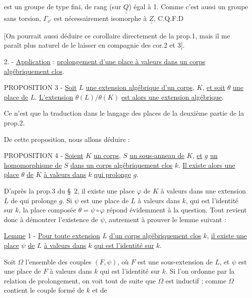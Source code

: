 est un groupe de type fini, de rang (sur $\underline{\underline Q}$) égal à 1. Comme c'est aussi un groupe sans torsion, $\Gamma_{v'}$ est nécessairement isomorphe à $\underline{\underline Z}$, C.Q.F.D

[On pourrait aussi déduire ce corollaire directement de la prop.1, mais il me paraît plus naturel de le laisser en compagnie des cor.2 et 3].

2. - \uline{Application} : \uline{prolongement d'une place à valeurs dans un corps algébriquement clos}.

PROPOSITION 3 - \uline{Soit} $L$ \uline{une extension algébrique d'un corps}, $K$, \uline{et soit} $\theta$ \uline{une place de} $L$. \uline{L'extension} $\theta(L)/\theta(K)$ \uline{est alors une extension algébrique}.

Ce n'est que la traduction dans le langage des places de la deuxième partie de la prop.2.

De cette proposition, nous allons déduire :

PROPOSITION 4 - \uline{Soient} $K$ \uline{un corps}, $S$ \uline{un sous-anneau de} $K$, \uline{et} $g$ \uline{un homomorphisme de} $S$ \uline{dans un corps algébriquement clos} $k$. \uline{Il existe alors une place} $\theta$ \uline{de} $K$ \uline{à valeurs dans} $k$ \uline{qui prolonge} $g$.

D'après la prop.3 du \S\ 2, il existe une place $\varphi$ de $K$ à valeurs dans une extension $L$ de  qui prolonge $g$. Si $\psi$ est une place de $L$ à valeurs dans $k$, qui est l'identité sur $k$, la place composée $\theta=\psi\circ\varphi$ répond évidemment à la question. Tout revient donc à démontrer l'existence de $\psi$, autrement  à prouver le lemme suivant :

\uline{Lemme} 1 - \uline{Pour toute extension} $L$ \uline{d'un corps algébriquement clos} $k$, \uline{il existe une place} $\psi$ \uline{de} $L$ \uline{à valeurs dans} $k$ \uline{qui est l'identité sur} $k$.

Soit $\Omega$ l'ensemble des couples $(F,\psi)$, où $F$ est une sous-extension de $L$, et $\psi$ est une place de $F$ à valeurs dans $k$ qui est l'identité sur $k$. Si l'on ordonne \inserted{$\Omega$} par la relation de prolongement, on voit tout de suite que $\Omega$ est inductif ; comme $\Omega$ contient le couple formé de $k$ et de

